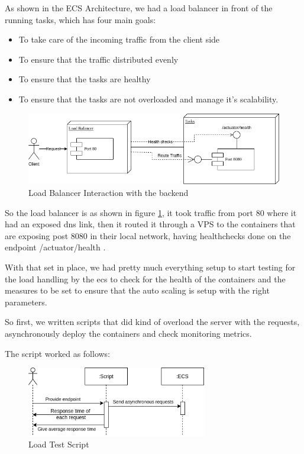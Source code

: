 As shown in the ECS Architecture, we had a load balancer in front of the running tasks, which has four main goals:

\begin{itemize}
    \item To take care of the incoming traffic from the client side
    \item To ensure that the traffic distributed evenly
    \item To ensure that the tasks are healthy
    \item To ensure that the tasks are not overloaded and manage it's scalability.
\end{itemize}

\begin{figure}[!htbp]
    \centering
    \includegraphics[width=\textwidth]{images/loadBalancer.png}
    \caption{\footnotesize{Load Balancer Interaction with the backend}}
    \label{fig:loadbalancer}
\end{figure}

So the load balancer is as shown in figure \ref{fig:loadbalancer}, it took traffic from
port 80 where it had an exposed dns link, then it routed it through a VPS to the
containers that are exposing post 8080 in their local network, having healthchecks
done on the endpoint /actuator/health .

\newpage

With that set in place, we had pretty much everything setup to start testing for the
load handling by the ecs to check for the health of the containers and the measures
to be set to ensure that the auto scaling is setup with the right parameters.

So first, we written scripts that did kind of overload the server with the requests,
asynchronously deploy the containers and check monitoring metrics.


The script worked as follows:

\begin{figure}[!htbp]
    \centering
    \includegraphics[width=0.7\textwidth]{images/scriptdos.png}
    \caption{\footnotesize{Load Test Script}}
    \label{fig:loadtest}
\end{figure}

